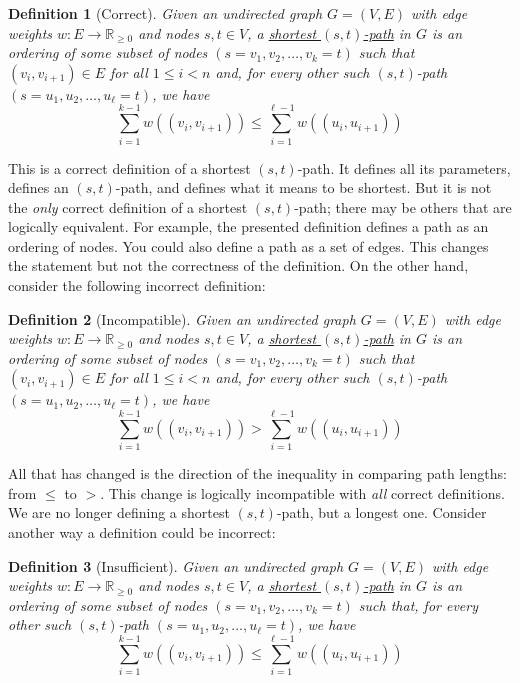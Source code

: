 \documentclass[10pt]{article}
\newtheorem*{definition}{Definition}
\begin{document}
\begin{definition}[Correct]
Given an undirected graph $G = (V, E)$ with edge weights $w : E \to \mathbb{R}_{\geq 0}$ and nodes $s, t \in V$, a \underline{shortest $(s,t)$-path} in $G$ is an ordering of some subset of nodes $(s = v_1, v_2, \ldots, v_k = t)$ such that $(v_i, v_{i+1}) \in E$ for all $1 \leq i < n$ and, for every other such $(s,t)$-path $(s = u_1, u_2, \ldots, u_\ell = t)$, we have
\[\sum_{i=1}^{k-1} w((v_i, v_{i+1})) \leq \sum_{i=1}^{\ell - 1} w((u_i, u_{i+1}))\]
\end{definition}

This is a correct definition of a shortest $(s,t)$-path.
It defines all its parameters, defines an $(s,t)$-path, and defines what it means to be shortest.
But it is not the \textit{only} correct definition of a shortest $(s,t)$-path; there may be others that are logically equivalent.
For example, the presented definition defines a path as an ordering of nodes.
You could also define a path as a set of edges.
This changes the statement but not the correctness of the definition.
On the other hand, consider the following incorrect definition:

\begin{definition}[Incompatible]
Given an undirected graph $G = (V, E)$ with edge weights $w : E \to \mathbb{R}_{\geq 0}$ and nodes $s, t \in V$, a \underline{shortest $(s,t)$-path} in $G$ is an ordering of some subset of nodes $(s = v_1, v_2, \ldots, v_k = t)$ such that $(v_i, v_{i+1}) \in E$ for all $1 \leq i < n$ and, for every other such $(s,t)$-path $(s = u_1, u_2, \ldots, u_\ell = t)$, we have
\[\sum_{i=1}^{k-1} w((v_i, v_{i+1})) > \sum_{i=1}^{\ell - 1} w((u_i, u_{i+1}))\]
\end{definition}

All that has changed is the direction of the inequality in comparing path lengths: from $\leq$ to $>$.
This change is logically incompatible with \textit{all} correct definitions.
We are no longer defining a shortest $(s,t)$-path, but a longest one.
Consider another way a definition could be incorrect:

\begin{definition}[Insufficient]
Given an undirected graph $G = (V, E)$ with edge weights $w : E \to \mathbb{R}_{\geq 0}$ and nodes $s, t \in V$, a \underline{shortest $(s,t)$-path} in $G$ is an ordering of some subset of nodes $(s = v_1, v_2, \ldots, v_k = t)$ such that, for every other such $(s,t)$-path $(s = u_1, u_2, \ldots, u_\ell = t)$, we have
\[\sum_{i=1}^{k-1} w((v_i, v_{i+1})) \leq \sum_{i=1}^{\ell - 1} w((u_i, u_{i+1}))\]
\end{definition}
\end{document}
